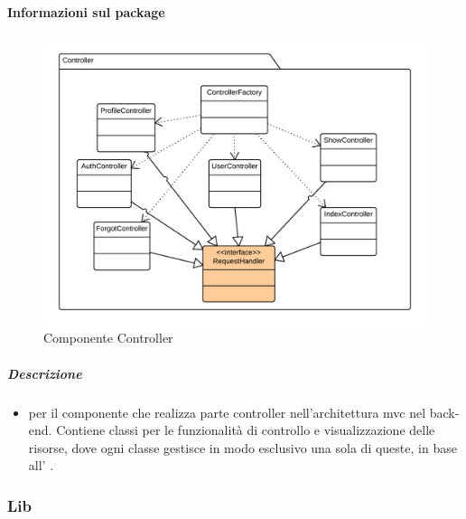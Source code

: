   \paragraph{Informazioni sul package} 
    \begin{figure}[H] 
      \begin{center} 
        \includegraphics[width=\textwidth]{uml/package/Back-end::Lib::Controller::Controller.png}  
        \caption{Componente Controller}
      \end{center}  
    \end{figure} 
  \subparagraph{Descrizione} 
    \begin{itemize}
    \item[]  per il componente che realizza parte controller nell’architettura mvc nel back-
end. Contiene classi per le funzionalità di controllo e visualizzazione delle risorse, dove ogni
classe gestisce in modo esclusivo una sola di queste, in base all’  .

    \end{itemize} 
  \subsubsection{Lib}
